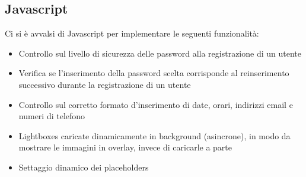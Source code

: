 \pagebreak

\subsection{Javascript}
Ci si è avvalsi di Javascript per implementare le seguenti funzionalità:
\begin{itemize}
\item Controllo sul livello di sicurezza delle password alla registrazione di un utente
\item Verifica se l'inserimento della password scelta corrisponde al reinserimento successivo durante la registrazione di un utente
\item Controllo sul corretto formato d'inserimento di date, orari, indirizzi email e numeri di telefono
\item Lightboxes caricate dinamicamente in background (asincrone), in modo da mostrare le immagini in overlay, invece di caricarle a parte
\item Settaggio dinamico dei placeholders
\end{itemize}